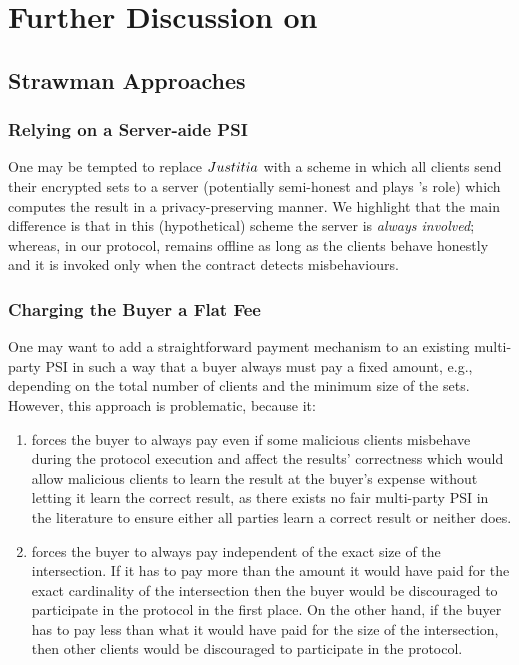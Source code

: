 

\section{Further Discussion on  \withFai}\label{sec::Discussion-justitia}


\subsection{Strawman Approaches}


\subsubsection{Relying on a Server-aide PSI} One may be tempted to replace ${Justitia}$ with a scheme in which all clients send their encrypted sets to a server (potentially semi-honest and plays \aud's role) which computes the result in a privacy-preserving manner.  We highlight that the main difference is that in this (hypothetical) scheme the server is \emph{always involved};  whereas, in our protocol, \aud remains offline as long as the clients behave honestly and it is invoked only when the contract detects misbehaviours.  


\subsubsection{Charging the Buyer a Flat Fee}
One may want to add a straightforward payment mechanism to an existing multi-party PSI in such a way that a buyer always must pay a fixed amount, e.g., depending on the total number of clients and the minimum size of the sets. However, this approach is problematic, because it:

\begin{enumerate}
\item forces the buyer to always pay even if some malicious clients misbehave during the protocol execution and affect the results' correctness which would allow malicious clients to learn the result at the buyer's expense without letting it learn the correct result, as there exists no fair multi-party PSI in the literature to ensure either all parties learn a correct result or neither does. 

\item forces the buyer to always pay independent of the exact size of the intersection. If it has to pay more than the amount it would have paid for the exact cardinality of the intersection then the buyer would be discouraged to participate in the protocol in the first place. On the other hand, if the buyer has to pay less than what it would have paid for the size of the intersection, then other clients would be discouraged to participate in the protocol. 

\end{enumerate}






 





